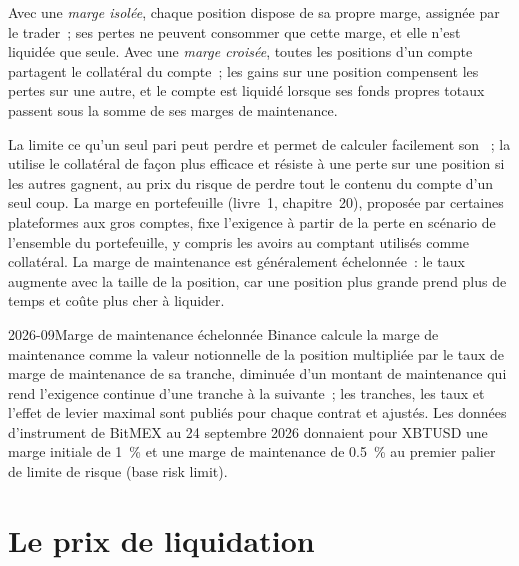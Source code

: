 \begin{definition}\label{def:m3:margin-liquidation-and-loss-allocation:modes}
Avec une \emph{marge isolée}, chaque position dispose de sa propre marge, assignée par le trader~;
ses pertes ne peuvent consommer que cette marge, et elle n'est liquidée que seule. Avec une \emph{marge
croisée}, toutes les positions d'un compte partagent le collatéral du compte~; les gains sur une position compensent
les pertes sur une autre, et le compte est liquidé lorsque ses fonds propres totaux passent sous la somme de ses marges
de maintenance.
\end{definition}

La  limite ce qu'un seul pari peut perdre et permet de calculer facilement son ~; la 
utilise le collatéral de façon plus efficace et résiste à une perte sur une position si les autres gagnent, au prix du risque de perdre
tout le contenu du compte d'un seul coup. La marge en portefeuille (livre~1, chapitre~20), proposée par certaines plateformes
aux gros comptes, fixe l'exigence à partir de la perte en scénario de l'ensemble du portefeuille, y compris les avoirs au comptant
utilisés comme collatéral. La marge de maintenance est généralement échelonnée~: le taux augmente avec la taille de la position, car
une position plus grande prend plus de temps et coûte plus cher à liquider.

\begin{dated}{2026-09}{Marge de maintenance échelonnée}\label{dat:m3:margin-liquidation-and-loss-allocation:tiers}
Binance calcule la marge de maintenance comme la valeur notionnelle de la position multipliée par le taux de marge de maintenance de sa
tranche, diminuée d'un montant de maintenance qui rend l'exigence continue d'une tranche à la suivante~;
les tranches, les taux et l'effet de levier maximal sont publiés pour chaque contrat et ajustés. Les données d'instrument de BitMEX
au 24 septembre 2026 donnaient pour XBTUSD une marge initiale de 1~\% et une marge de maintenance de 0.5~\% au premier palier de limite de risque (base risk limit).
\end{dated}

\section{Le prix de liquidation}

